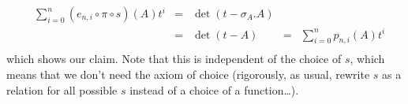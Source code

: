 \begin{example}
\begin{equation}
    \begin{aligned}
      &\sum_{i=0}^n (e_{n,i} \circ \pi \circ s)(A)t^i&=&\operatorname{det}(t-\sigma_A.A)\\
      &&=&\operatorname{det}(t-A)
      &=&\sum_{i=0}^n p_{n,i}(A)t^i\\
    \end{aligned}
  \end{equation}
  which shows our claim.
  Note that this is independent of the choice of $s$, which means that we don't need the axiom of choice (rigorously, as usual, rewrite $s$ as a relation for all possible $s$ instead of a choice of a function\ldots).
\end{example}

